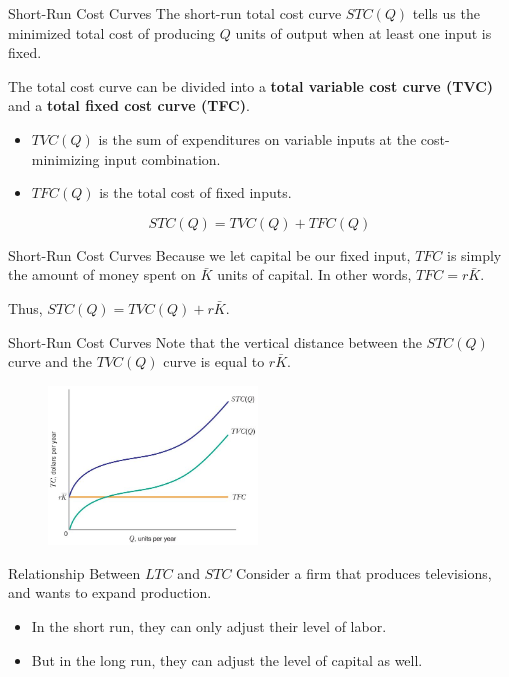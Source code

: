 \documentclass[11pt,t]{beamer}
\begin{document}
\begin{frame}{Short-Run Cost Curves}
  The short-run total cost curve $STC(Q)$ tells us the minimized total cost of producing $Q$ units of output when at least one input is fixed.

  \pause\bigskip
  The total cost curve can be divided into a \textbf{total variable cost curve (TVC)} and a \textbf{total fixed cost curve (TFC)}.

  \begin{itemize}
    \item $TVC(Q)$ is the sum of expenditures on variable inputs at the cost-minimizing input combination.
    
    \item $TFC(Q)$ is the total cost of fixed inputs.
  \end{itemize}

  $$
    STC(Q) = TVC(Q) + TFC(Q)
  $$

\end{frame}

\begin{frame}{Short-Run Cost Curves}
  Because we let capital be our fixed input, $TFC$ is simply the amount of money spent on $\bar{K}$ units of capital. In other words, $TFC = r\bar{K}$.

  \bigskip
  Thus, $STC(Q) = TVC(Q) + r\bar{K}$.
\end{frame}

\begin{frame}{Short-Run Cost Curves}
  Note that the vertical distance between the $STC(Q)$ curve and the $TVC(Q)$ curve is equal to $r\bar{K}$.

  \begin{figure}
    \includegraphics[width=210px]{figures/fig8_13.jpg}
  \end{figure}
\end{frame}

\begin{frame}{Relationship Between $LTC$ and $STC$}
  Consider a firm that produces televisions, and wants to expand production.

  \begin{itemize}
    \item In the short run, they can only adjust their level of labor.
    
    \item But in the long run, they can adjust the level of capital as well.
  \end{itemize}
\end{frame}
\end{document}
